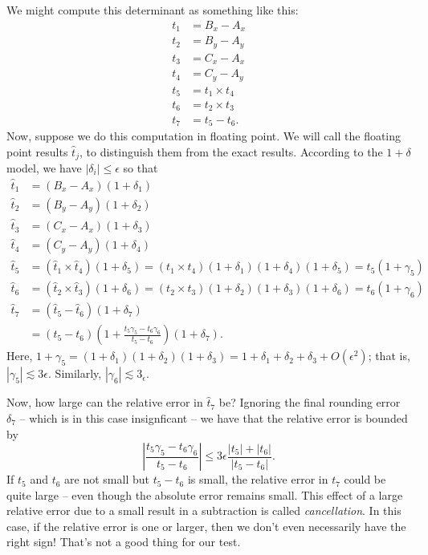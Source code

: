 \documentclass[12pt, leqno]{article}
\begin{document}
We might compute this determinant as something like this:
\begin{align*}
  t_1 &= B_x-A_x \\
  t_2 &= B_y-A_y \\
  t_3 &= C_x-A_x \\
  t_4 &= C_y-A_y \\
  t_5 &= t_1 \times t_4 \\
  t_6 &= t_2 \times t_3 \\
  t_7 &= t_5-t_6.
\end{align*}
Now, suppose we do this computation in floating point.  We will call
the floating point results $\hat{t}_j$, to distinguish them from the
exact results.  According to the $1+\delta$ model,
we have $|\delta_i| \leq \epsilon$ so that
\begin{align*}
  \hat{t}_1 &= (B_x-A_x)(1+\delta_1) \\
  \hat{t}_2 &= (B_y-A_y)(1+\delta_2) \\
  \hat{t}_3 &= (C_x-A_x)(1+\delta_3) \\
  \hat{t}_4 &= (C_y-A_y)(1+\delta_4) \\
  \hat{t}_5 &= (\hat{t}_1 \times \hat{t}_4)(1+\delta_5)
             = (t_1 \times t_4)(1+\delta_1)(1+\delta_4)(1+\delta_5)
             = t_5 (1+\gamma_5) \\
  \hat{t}_6 &= (\hat{t}_2 \times \hat{t}_3)(1+\delta_6) 
             = (t_2 \times t_3)(1+\delta_2)(1+\delta_3)(1+\delta_6) 
             = t_6 (1+\gamma_6) \\
  \hat{t}_7 &= (\hat{t}_5-\hat{t}_6)(1+\delta_7) \\
            &= (t_5-t_6)
               \left( 1 + \frac{t_5 \gamma_5 - t_6 \gamma_6}{t_5-t_6} \right) 
               (1 + \delta_7).
\end{align*}
Here, $1 + \gamma_5 = (1+\delta_1)(1+\delta_2)(1+\delta_3) 
= 1+\delta_1 + \delta_2 + \delta_3 + O(\epsilon^2)$; that is,
$|\gamma_5| \lesssim 3 \epsilon$.
Similarly, $|\gamma_6| \lesssim 3_{\epsilon}$.

Now, how large can the relative error in $\hat{t}_7$ be?  Ignoring the final
rounding error $\delta_7$ -- which is in this case insignficant -- we have
that the relative error is bounded by
\[
  \left| \frac{t_5 \gamma_5 - t_6 \gamma_6}{t_5-t_6} \right| \leq
  3 \epsilon \frac{|t_5| + |t_6|}{|t_5-t_6|}.
\]
If $t_5$ and $t_6$ are not small but $t_5-t_6$ is small, the relative error
in $t_7$ could be quite large -- even though the absolute error remains small.
This effect of a large relative error due to a small result in a subtraction
is called {\em cancellation}.  In this case,
if the relative error is one or larger, then we don't even necessarily
have the right sign!  That's not a good thing for our test.
\end{document}
